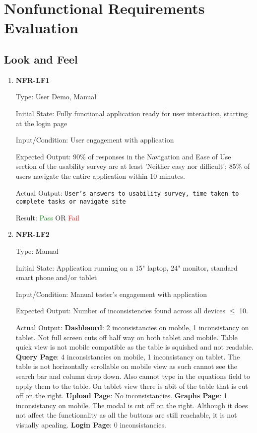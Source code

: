 \documentclass[12pt, titlepage]{article}
\begin{document}
\section{Nonfunctional Requirements Evaluation}

\subsection{Look and Feel}
\begin{enumerate}
\item{\textbf{NFR-LF1}} \label{NFR:LF1}

Type: User Demo, Manual

Initial State: Fully functional application ready for user interaction, starting
at the login page

Input/Condition: User engagement with application

Expected Output: 90\% of responses in the Navigation and Ease of Use section of
the usability survey are at least 'Neither easy nor difficult'; 85\% of users
navigate the entire application within 10 minutes.

Actual Output: \texttt{User's answers to usability survey, time taken to
complete tasks or navigate site}

Result: \textcolor{green}{Pass} OR \textcolor{red}{Fail}

\item{\textbf{NFR-LF2}} \label{NFR:LF2}

Type: Manual

Initial State: Application running on a 15" laptop, 24" monitor, standard smart
phone and/or tablet

Input/Condition: Manual tester's engagement with application

Expected Output: Number of inconsistencies found across all devices $\leq$ 10.

Actual Output: \newline
\textbf{Dashbaord}: 2 inconsistancies on mobile, 1 inconsistancy on tablet. Not
full screen cuts off half way on both tablet and mobile. Table quick view is not
mobile compatible as the table is squished and not readable.\newline
\textbf{Query Page}: 4 inconsistancies on mobile, 1 inconsistancy on tablet. The
table is not horizontally scrollable on mobile view as such cannot see the
search bar and column drop down. Also cannot type in the equations field to
apply them to the table. On tablet view there is abit of the table that is cut
off on the right. \newline
\textbf{Upload Page}: No inconsistancies.\newline
\textbf{Graphs Page}: 1 inconsistancy on mobile. The modal is cut off on the
right. Although it does not affect the functionality as all the buttons are
still reachable, it is not visually apealing. \newline
\textbf{Login Page}: 0 inconsistancies.


\end{enumerate}
\end{document}
